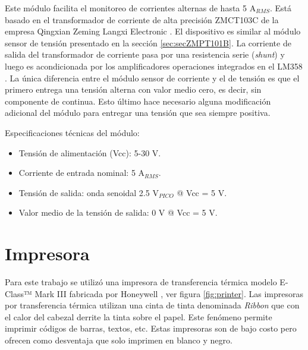 Este módulo facilita el monitoreo de corrientes alternas de hasta 5 A$_{RMS}$. Está basado en el transformador de corriente de alta precisión ZMCT103C de la empresa Qingxian Zeming Langxi Electronic \citep{ZMCT103C_b}. El dispositivo es similar al módulo sensor de tensión presentado en la sección \ref{sec:secZMPT101B}. La corriente de salida del transformador de corriente pasa por una resistencia serie (\textit{shunt}) y luego es acondicionada por los amplificadores operaciones integrados en el LM358 \citep{LM358}. La única diferencia entre el módulo sensor de corriente y el de tensión es que el primero entrega una tensión alterna con valor medio cero, es decir, sin componente de continua. Esto último hace necesario alguna modificación adicional del módulo para entregar una tensión que sea siempre positiva.

Especificaciones técnicas del módulo: 
\begin{itemize}
\item Tensión de alimentación (Vcc): 5-30 V.
\item Corriente de entrada nominal: 5 A$_{RMS}$.
\item Tensión de salida: onda senoidal 2.5 V$_{PICO}$ @ Vcc = 5 V.
\item Valor medio de la tensión de salida: 0 V @ Vcc = 5 V.
\end{itemize}

\section{Impresora}
\label{sec:Impre}
Para este trabajo se utilizó una impresora de transferencia térmica modelo E-Class™ Mark III fabricada por Honeywell \citep{printer_b}, ver figura \ref{fig:printer}. Las impresoras por transferencia térmica utilizan una cinta de tinta denominada \textit{Ribbon} que con el calor del cabezal derrite la tinta sobre el papel. Este fenómeno permite imprimir códigos de barras, textos, etc. Estas impresoras son de bajo costo pero ofrecen como desventaja que solo imprimen en blanco y negro.

